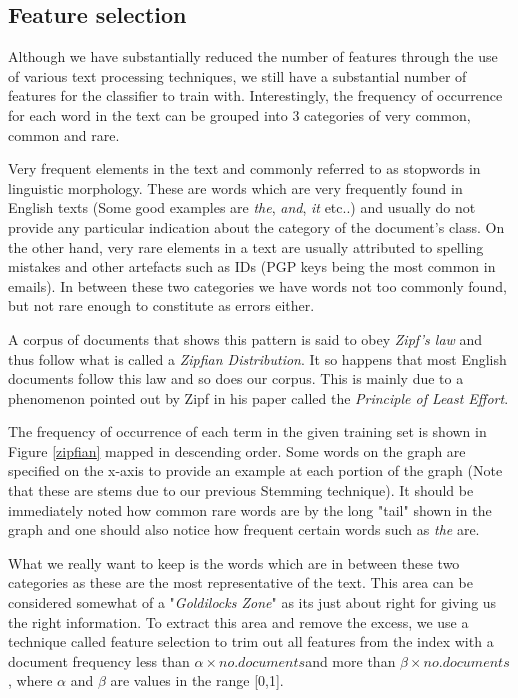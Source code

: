 \subsection{Feature selection}
Although we have substantially reduced the number of features through the use of various text processing techniques, we still have a substantial number of features for the classifier to train with. Interestingly, the frequency of occurrence for each word in the text can be grouped into 3 categories of very common, common and rare. 

Very frequent elements in the text and commonly referred to as stopwords in linguistic morphology. These are words which are very frequently found in English texts (Some good examples are {\it the}, {\it and}, {\it it} etc..) and usually do not provide any particular indication about the category of the document's class. On the other hand, very rare elements in a text are usually attributed to spelling mistakes and other artefacts such as IDs (PGP keys being the most common in emails). In between these two categories we have words not too commonly found, but not rare enough to constitute as errors either.

A corpus of documents that shows this pattern is said to obey {\it Zipf's law} \cite{zipf1949} and thus follow what is called a {\it Zipfian Distribution}. It so happens that most English documents follow this law and so does our corpus. This is mainly due to a phenomenon pointed out by Zipf in his paper called the {\it Principle of Least Effort}.

The frequency of occurrence of each term in the given training set is shown in Figure \ref{zipfian}  mapped in descending order. Some words on the graph are specified on the x-axis to provide an example at each portion of the graph (Note that these are stems due to our previous Stemming technique). It should be immediately noted how common rare words are by the long "tail" shown in the graph and one should also notice how frequent certain words such as {\it the} are.

What we really want to keep is the words which are in between these two categories as these are the most representative of the text. This area can be considered somewhat of a "{\it Goldilocks Zone}" as its just about right for giving us the right information. To extract this area and remove the excess, we use a technique called feature selection to trim out all features from the index with a document frequency less than \(\alpha \times no. documents\)and more than \(\beta \times no. documents\), where \(\alpha\) and \(\beta\) are values in the range [0,1].

